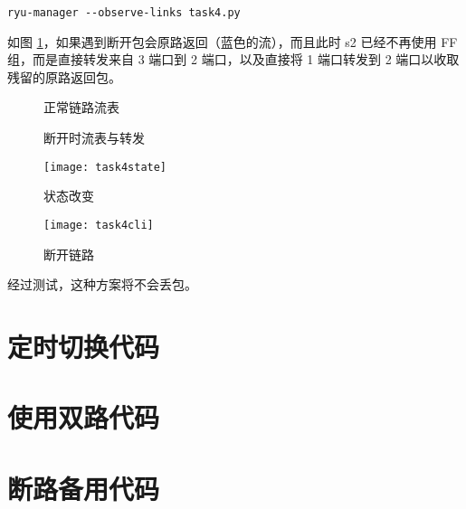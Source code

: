     \begin{lstlisting}[style=commandshell]
ryu-manager --observe-links task4.py\end{lstlisting}

    如图 \ref{fig:topobreak}，如果遇到断开包会原路返回（蓝色的流），而且此时 s2 已经不再使用 FF 组，而是直接转发来自 3 端口到 2 端口，以及直接将 1 端口转发到 2 端口以收取残留的原路返回包。

    \begin{figure}[H]
        \centering
        \begin{minipage}{0.48\textwidth}
            \centering
            
            \caption{正常链路流表}\label{fig:toponormal}
        \end{minipage}
        \begin{minipage}{0.48\textwidth}
            \centering
            
            \caption{断开时流表与转发}\label{fig:topobreak}
        \end{minipage}
    \end{figure}

    \begin{figure}[H]
        \centering
        \begin{minipage}{0.48\textwidth}
            \centering
            \texttt{[image: task4state]}
            \caption{状态改变}\label{fig:task4state}
        \end{minipage}
        \begin{minipage}{0.48\textwidth}
            \centering
            \texttt{[image: task4cli]}
            \caption{断开链路}\label{fig:task4cli}
        \end{minipage}
    \end{figure}

    经过测试，这种方案将不会丢包。


    

    \appendix

    \section{定时切换代码}\label{sec:per5}


    \section{使用双路代码}\label{sec:balance}


    \section{断路备用代码}\label{sec:backup}


